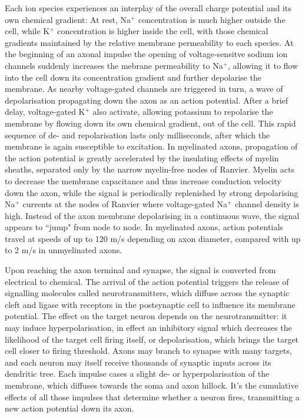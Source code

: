 Each ion species experiences an interplay of the overall charge potential and its own chemical gradient:
At rest, Na$^+$ concentration is much higher outside the cell, while K$^+$ concentration is higher inside the cell, with those chemical gradients maintained by the relative membrane permeability to each species.
At the beginning of an axonal impulse the opening of voltage-sensitve sodium ion channels suddenly increases the mebrane permeability to Na$^+$, allowing it to flow into the cell down its concentration gradient and further depolarise the membrane.
As nearby voltage-gated channels are triggered in turn, a wave of depolarisation propagating down the axon as an action potential.
After a brief delay, voltage-gated K$^+$ also activate, allowing potassium to repolarise the membrane by flowing down its own chemical gradient, out of the cell.
This rapid sequence of de- and repolarisation lasts only milliseconds, after which the membrane is again susceptible to excitation.
In myelinated axons, propagation of the action potential is greatly accelerated by the insulating effects of myelin sheaths, separated only by the narrow myelin-free nodes of Ranvier.
Myelin acts to decrease the membrane capacitance and thus increase conduction velocity down the axon, while the signal is periodically replenished by strong depolarising Na$^+$ currents at the nodes of Ranvier where voltage-gated Na$^+$ channel density is high.
Instead of the axon membrane depolarising in a continuous wave, the signal appears to ``jump" from node to node.
In myelinated axons, action potentials travel at speeds of up to 120 m/s depending on axon diameter, compared with up to 2 m/s in unmyelinated axons.

Upon reaching the axon terminal and synapse, the signal is converted from electrical to chemical.
The arrival of the action potential triggers the release of signalling molecules called neurotransmitters, which diffuse across the synaptic cleft and ligase with receptors in the postsynaptic cell to influence its membrane potential.
The effect on the target neuron depends on the neurotransmitter: it may induce hyperpolarisation, in effect an inhibitory signal which decreases the likelihood of the target cell firing itself, or depolarisation, which brings the target cell closer to firing threshold.
Axons may branch to synapse with many targets, and each neuron may itself receive thousands of synaptic inputs across its dendritic tree.
Each impulse cases a slight de- or hyperpolarisation of the membrane, which diffuses towards the soma and axon hillock.
It's the cumulative effects of all those impulses that determine whether a neuron fires, transmitting a new action potential down its axon.

